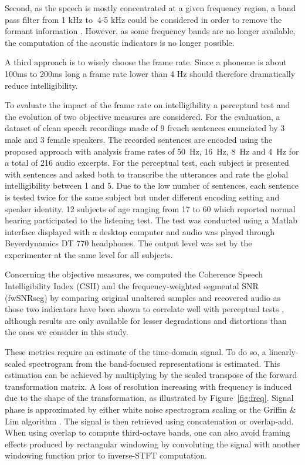 \documentclass[final,3p,times,twocolumn]{elsarticle}
\begin{document}
Second, as the speech is mostly concentrated at a given frequency region, a band pass filter from 1 kHz to $~$4-5 kHz could be considered in order to remove the formant information \cite{kent1992acoustic}. However, as some frequency bands are no longer available, the computation of the acoustic indicators is no longer possible.

A third approach is to wisely choose the frame rate. Since a phoneme is about 100ms to 200ms long \cite{kuwabara1996acoustic} \cite{rosen1992temporal} a frame rate lower than 4 Hz should therefore dramatically reduce intelligibility.

To evaluate the impact of the frame rate on intelligibility a perceptual test and the evolution of two objective measures are considered. For the evaluation, a dataset of clean speech recordings made of 9 french sentences enunciated by 3 male and 3 female speakers. The recorded sentences are encoded using the proposed approach with analysis frame rates of 50~Hz, 16~Hz, 8~Hz and 4~Hz for a total of 216 audio excerpts. For the perceptual test, each subject is presented with sentences and asked both to transcribe the utterances and rate the global intelligibility between 1 and 5. Due to the low number of sentences, each sentence is tested twice for the same subject but under different encoding setting and speaker identity. 12 subjects of age ranging from 17 to 60 which reported normal hearing participated to the listening test. The test was conducted using a Matlab interface displayed with a desktop computer and audio was played through Beyerdynamics DT 770 headphones. The output level was set by the experimenter at the same level for all subjects.

Concerning the objective measures, we computed the Coherence Speech Intelligibility Index \cite{kates2005} (CSII) and the frequency-weighted segmental SNR \cite{hu2008} (fwSNRseg) by comparing original unaltered samples and recovered audio as those two indicators have been shown to correlate well with perceptual tests \cite{ma2009}, although results are only available for lesser degradations and distortions than the ones we consider in this study.

These metrics require an estimate of the time-domain signal. To do so, a linearly-scaled spectrogram from the band-focused representations is estimated. This estimation can be achieved by multiplying by the scaled transpose of the forward transformation matrix. A loss of resolution increasing with frequency is induced due to the shape of the transformation, as illustrated by Figure~\ref{fig:freq}. Signal phase is approximated by either white noise spectrogram scaling or the Griffin \& Lim algorithm \cite{griffin1984}. The signal is then retrieved using concatenation or overlap-add. When using overlap to compute third-octave bands, one can also avoid framing effects produced by rectangular windowing by convoluting the signal with another windowing function prior to inverse-STFT computation.
\end{document}
